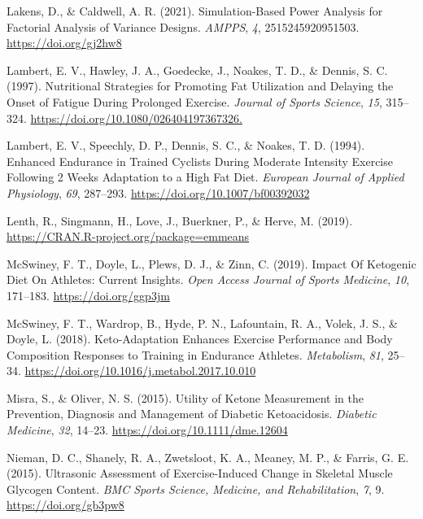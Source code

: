 \documentclass[]{cik}%
\newlength{\cslhangindent}
\newlength{\cslentryspacingunit} %
\newenvironment{CSLReferences}[2] %
 {%
  \setlength{\parindent}{0pt}
  \ifodd #1
  \let\oldpar\par
  \def\par{\hangindent=\cslhangindent\oldpar}
  \fi
  \setlength{\parskip}{#2\cslentryspacingunit}
 }%
 {}
\begin{document}
\begin{CSLReferences}{1}{0}
\leavevmode{}%
Lakens, D., \& Caldwell, A. R. (2021). Simulation-Based Power Analysis
for Factorial Analysis of Variance Designs. \emph{AMPPS}, \emph{4},
2515245920951503. \url{https://doi.org/gj2hw8}

\leavevmode{}%
Lambert, E. V., Hawley, J. A., Goedecke, J., Noakes, T. D., \& Dennis,
S. C. (1997). Nutritional Strategies for Promoting Fat Utilization and
Delaying the Onset of Fatigue During Prolonged Exercise. \emph{Journal
of Sports Science}, \emph{15}, 315--324.
\url{https://doi.org/10.1080/026404197367326.}

\leavevmode{}%
Lambert, E. V., Speechly, D. P., Dennis, S. C., \& Noakes, T. D. (1994).
Enhanced Endurance in Trained Cyclists During Moderate Intensity
Exercise Following 2 Weeks Adaptation to a High Fat Diet. \emph{European
Journal of Applied Physiology}, \emph{69}, 287--293.
\url{https://doi.org/10.1007/bf00392032}

\leavevmode{}%
Lenth, R., Singmann, H., Love, J., Buerkner, P., \& Herve, M. (2019).
\url{https://CRAN.R-project.org/package=emmeans}

\leavevmode{}%
McSwiney, F. T., Doyle, L., Plews, D. J., \& Zinn, C. (2019). Impact Of
Ketogenic Diet On Athletes: Current Insights. \emph{Open Access Journal
of Sports Medicine}, \emph{10}, 171--183. \url{https://doi.org/ggp3jm}

\leavevmode{}%
McSwiney, F. T., Wardrop, B., Hyde, P. N., Lafountain, R. A., Volek, J.
S., \& Doyle, L. (2018). Keto-Adaptation Enhances Exercise Performance
and Body Composition Responses to Training in Endurance Athletes.
\emph{Metabolism}, \emph{81}, 25--34.
\url{https://doi.org/10.1016/j.metabol.2017.10.010}

\leavevmode{}%
Misra, S., \& Oliver, N. S. (2015). Utility of Ketone Measurement in the
Prevention, Diagnosis and Management of Diabetic Ketoacidosis.
\emph{Diabetic Medicine}, \emph{32}, 14--23.
\url{https://doi.org/10.1111/dme.12604}

\leavevmode{}%
Nieman, D. C., Shanely, R. A., Zwetsloot, K. A., Meaney, M. P., \&
Farris, G. E. (2015). Ultrasonic Assessment of Exercise-Induced Change
in Skeletal Muscle Glycogen Content. \emph{BMC Sports Science, Medicine,
and Rehabilitation}, \emph{7}, 9. \url{https://doi.org/gb3pw8}


\end{CSLReferences}
\end{document}
